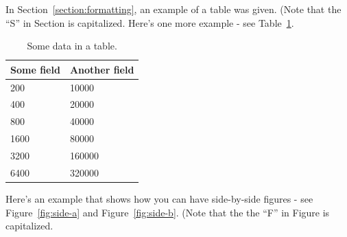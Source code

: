 \documentclass[pageno]{jpaper}
\begin{document}
In Section~\ref{section:formatting}, an example of a table was given.
(Note that the ``S'' in Section is capitalized.  Here's one more
example - see Table~\ref{table:data}.

\begin{table}[hbt]
  \centering
  \begin{tabular}{|l|l|} \hline
    \textbf{Some field} & \textbf{Another field}\\\hline
    200          &  10000 \\ \hline 
    400          &  20000 \\ \hline 
    800          &  40000 \\ \hline 
    1600        &  80000 \\ \hline 
    3200        &  160000 \\ \hline 
    6400        &  320000 \\ \hline 
  \end{tabular}
  \caption{Some data in a table. }
  \label{table:data}
\end{table}


Here's an example that shows how you can have side-by-side figures -
see Figure~\ref{fig:side-a} and Figure~\ref{fig:side-b}.  (Note that
the the ``F'' in Figure is capitalized. 
\end{document}

